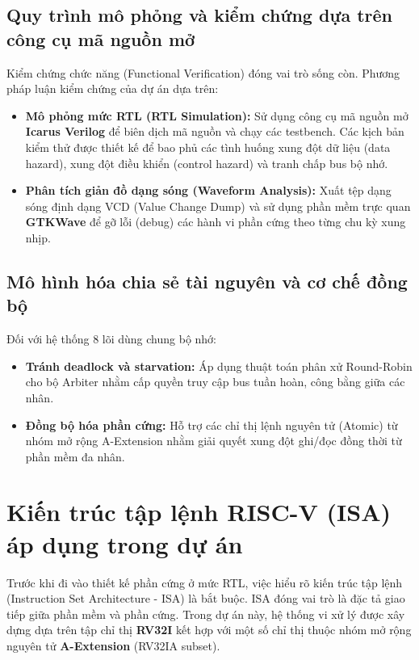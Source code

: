 \subsection{Quy trình mô phỏng và kiểm chứng dựa trên công cụ mã nguồn mở}
Kiểm chứng chức năng (Functional Verification) đóng vai trò sống còn. Phương pháp luận kiểm chứng của dự án dựa trên:
\begin{itemize}
    \item \textbf{Mô phỏng mức RTL (RTL Simulation):} Sử dụng công cụ mã nguồn mở \textbf{Icarus Verilog} để biên dịch mã nguồn và chạy các testbench. Các kịch bản kiểm thử được thiết kế để bao phủ các tình huống xung đột dữ liệu (data hazard), xung đột điều khiển (control hazard) và tranh chấp bus bộ nhớ.
    \item \textbf{Phân tích giản đồ dạng sóng (Waveform Analysis):} Xuất tệp dạng sóng định dạng VCD (Value Change Dump) và sử dụng phần mềm trực quan \textbf{GTKWave} để gỡ lỗi (debug) các hành vi phần cứng theo từng chu kỳ xung nhịp.
\end{itemize}

\subsection{Mô hình hóa chia sẻ tài nguyên và cơ chế đồng bộ}
Đối với hệ thống 8 lõi dùng chung bộ nhớ:
\begin{itemize}
    \item \textbf{Tránh deadlock và starvation:} Áp dụng thuật toán phân xử Round-Robin cho bộ Arbiter nhằm cấp quyền truy cập bus tuần hoàn, công bằng giữa các nhân.
    \item \textbf{Đồng bộ hóa phần cứng:} Hỗ trợ các chỉ thị lệnh nguyên tử (Atomic) từ nhóm mở rộng A-Extension nhằm giải quyết xung đột ghi/đọc đồng thời từ phần mềm đa nhân.
\end{itemize}

\section{Kiến trúc tập lệnh RISC-V (ISA) áp dụng trong dự án}
Trước khi đi vào thiết kế phần cứng ở mức RTL, việc hiểu rõ kiến trúc tập lệnh (Instruction Set Architecture - ISA) là bắt buộc. ISA đóng vai trò là đặc tả giao tiếp giữa phần mềm và phần cứng. Trong dự án này, hệ thống vi xử lý được xây dựng dựa trên tập chỉ thị \textbf{RV32I} kết hợp với một số chỉ thị thuộc nhóm mở rộng nguyên tử \textbf{A-Extension} (RV32IA subset).


